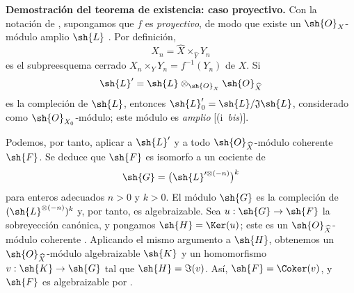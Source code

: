 \documentclass[oneside]{amsart}
\makeatletter
\newcommand{\ega@arrow}[2]{\mathchoice{#1}{#2}{#2}{#2}}
\renewcommand{\to}{\ega@arrow{\longrightarrow}{\rightarrow}}
\let\EGAOriginalLabel\label
\renewcommand{\label}[1]{\phantomsection\EGAOriginalLabel{#1}}
\makeatother
\begin{document}
\begin{env}[5.2.5]
\label{III.5.2.5}
\textbf{Demostración del teorema de existencia: caso proyectivo.}
Con la notación de , supongamos que $f$ es
\emph{proyectivo}, de modo que existe un $\sh{O}_X$-módulo amplio $\sh{L}$
. Por definición,
\[
  X_n=\widehat{X}\times_{\widehat{Y}}Y_n
\]
es el subpreesquema cerrado
$X_n\times_Y Y_n=f^{-1}(Y_n)$ de $X$. Si
\[
  \sh{L}'=\sh{L}\otimes_{\sh{O}_X}\sh{O}_{\widehat{X}}
\]
es la compleción de $\sh{L}$, entonces
$\sh{L}'_0=\sh{L}/\mathfrak{J}\sh{L}$, considerado como
$\sh{O}_{X_0}$-módulo; este módulo es \emph{amplio}
[(i~\emph{bis})].

Podemos, por tanto, aplicar  a $\sh{L}'$ y a todo
$\sh{O}_{\widehat{X}}$-módulo coherente $\sh{F}$. Se deduce que
$\sh{F}$ es isomorfo a un cociente de
\[
  \sh{G}=
  \bigl(\sh{L}'^{\otimes(-n)}\bigr)^k
\]
para enteros adecuados $n>0$ y $k>0$. El módulo $\sh{G}$ es la
compleción de $(\sh{L}^{\otimes(-n)})^k$
 y, por tanto, es algebraizable. Sea
$u:\sh{G}\to\sh{F}$ la sobreyección canónica, y pongamos
$\sh{H}=\Ker(u)$; este es un
$\sh{O}_{\widehat{X}}$-módulo coherente . Aplicando el mismo
argumento a $\sh{H}$, obtenemos un
$\sh{O}_{\widehat{X}}$-módulo algebraizable $\sh{K}$ y un homomorfismo
$v:\sh{K}\to\sh{G}$ tal que $\sh{H}=\Im(v)$. Así,
$\sh{F}=\Coker(v)$, y $\sh{F}$ es algebraizable por
.
\end{env}
\end{document}
